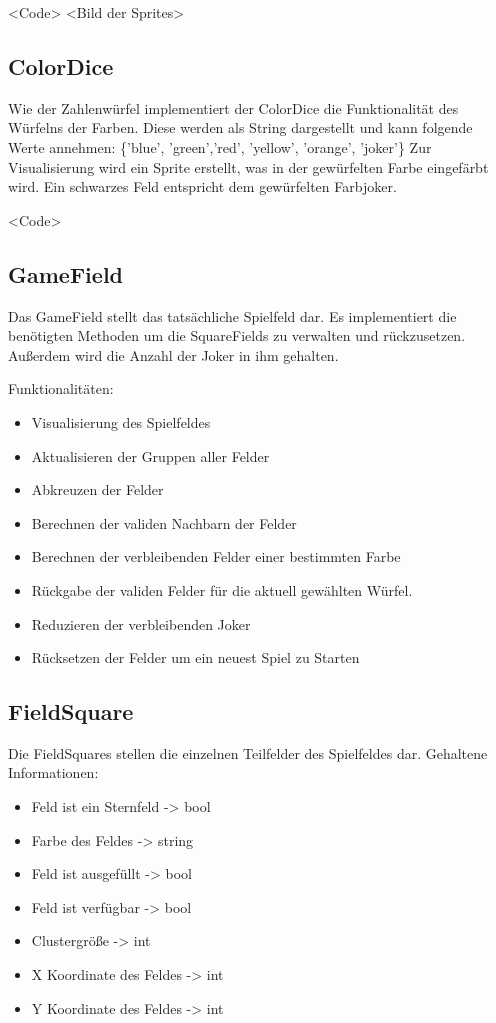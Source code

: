 <Code>
<Bild der Sprites>

\subsection{ColorDice}
Wie der Zahlenwürfel implementiert der ColorDice die Funktionalität des Würfelns der Farben.
Diese werden als String dargestellt und kann folgende Werte annehmen: \{'blue', 'green','red', 'yellow', 'orange', 'joker'\}
Zur Visualisierung wird ein Sprite erstellt, was in der gewürfelten Farbe eingefärbt wird.
Ein schwarzes Feld entspricht dem gewürfelten Farbjoker.

<Code>


\subsection{GameField}
Das GameField stellt das tatsächliche Spielfeld dar.
Es implementiert die benötigten Methoden um die SquareFields zu verwalten und rückzusetzen.
Außerdem wird die Anzahl der Joker in ihm gehalten.

Funktionalitäten:
\begin{itemize}
	\item  Visualisierung des Spielfeldes
    \item  Aktualisieren der Gruppen aller Felder
    \item  Abkreuzen der Felder
    \item  Berechnen der validen Nachbarn der Felder
    \item  Berechnen der verbleibenden Felder einer bestimmten Farbe
    \item  Rückgabe der validen Felder für die aktuell gewählten Würfel.
    \item  Reduzieren der verbleibenden Joker
    \item  Rücksetzen der Felder um ein neuest Spiel zu Starten
\end{itemize}

\subsection{FieldSquare}

Die FieldSquares stellen die einzelnen Teilfelder des Spielfeldes dar.
Gehaltene Informationen:
\begin{itemize}
    \item Feld ist ein Sternfeld    -> bool
    \item Farbe des Feldes          -> string
    \item Feld ist ausgefüllt       -> bool
    \item Feld ist verfügbar        -> bool
    \item Clustergröße              -> int
    \item X Koordinate des Feldes   -> int
    \item Y Koordinate des Feldes   -> int
\end{itemize}

